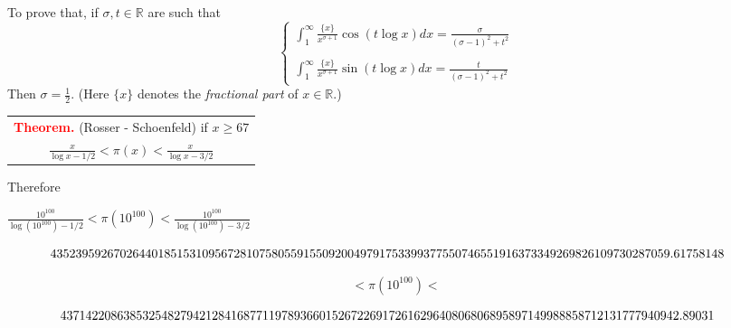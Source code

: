 \documentclass[landscape,display]{powersem} %
\newcommand{\heading}[1]{%
 \begin{center}
  \large\bf
  \shadowbox{{\textcolor{conceptcolor}{#1}}}%
 \end{center}
 \vspace{1ex minus 1ex}}
\begin{document}
\begin{slide}
\heading{The beautiful formula of Riemann}\pause

\ \ \ \ \ \ \ \ \ \ \pause\vspace*{-0.2cm}
\heading{Exercise}
To prove that, if $\sigma,t\in\mathbb R$ are such that
$$\begin{cases}\displaystyle{\int_1^\infty \frac{\{x\}}{x^{\sigma+1}}\cos(t\log x)dx=\frac{\sigma}{(\sigma-1)^2+t^2}}\\\\\displaystyle{\int_1^\infty \frac{\{x\}}{x^{\sigma+1}}\sin(t\log x)dx=\frac{t}{(\sigma-1)^2+t^2}}\end{cases}$$
Then $\sigma=\frac12$.\hfill\qquad\qquad\tiny{ (Here $\{x\}$ denotes the \emph{fractional part} of $x\in\mathbb R$.)}\end{slide}

\begin{slide}
\heading{Explicit distribution of prime numbers}\pause



\begin{center}
\begin{tabular}{|c|}\hline
\textbf{\textcolor{red}{Theorem.}} (Rosser - Schoenfeld) if $x\geq 67$\\
 $\displaystyle{\frac{x}{\log x-1/2}< \pi(x)< \frac{x}{\log x-3/2}}$\\
\hline\end{tabular}
\end{center}\pause

Therefore

 $\frac{10^{100}}{\log(10^{100})-1/2}<\pi(10^{100})< \frac{10^{100}}{\log(10^{100})-3/2}$\pause

\begin{tiny}
$$\hspace*{-0.5cm}43523959267026440185153109567281075805591550920049791753399377550746551916373349269826109730287059.61758148$$
\end{tiny}\vspace*{-5mm}
$$< \pi(10^{100})< $$
\begin{tiny}
$$\hspace*{-0.5cm}43714220863853254827942128416877119789366015267226917261629640806806895897149988858712131777940942.89031$$
\end{tiny}

\end{slide}
\end{document}
